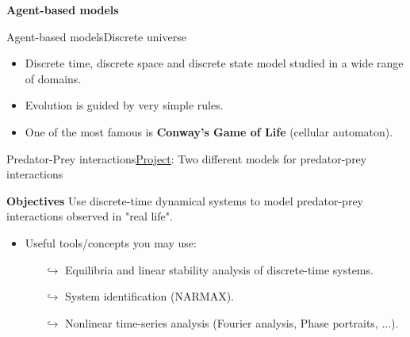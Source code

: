 \documentclass[usenames,dvipsnames,svgnames,10pt,aspectratio=169]{beamer}
\begin{document}
\begin{frame}[t, c]{}
	\centering
	\vspace{1cm}

	{\Large \textbf{Agent-based models}}

	\bigskip

	{}

\end{frame}

\begin{frame}[t, c]{Agent-based models}{Discrete universe}
	\begin{minipage}{.48\textwidth}
		\begin{itemize}
			\item Discrete time, discrete space and discrete state model studied in a wide range of domains.

			\bigskip

			\item Evolution is guided by very simple rules.

			\bigskip

			\item One of the most famous is \alert{\textbf{Conway's Game of Life}} (cellular automaton).
		\end{itemize}
	\end{minipage}%
	\hfill
	\begin{minipage}{.48\textwidth}

	\end{minipage}

	\vspace{1cm}
\end{frame}

\begin{frame}[t, c]{Predator-Prey interactions}{\underline{Project}: Two different models for predator-prey interactions}

		\begin{block}{\centering \textbf{Objectives}}
			\centering
			Use discrete-time dynamical systems to model predator-prey interactions observed in "real life".
		\end{block}

		\bigskip

		\begin{itemize}
			\item Useful tools/concepts you may use:
			\begin{itemize}
				\item[$\hookrightarrow$] Equilibria and linear stability analysis of discrete-time systems.
				\item[$\hookrightarrow$] System identification (NARMAX).
				\item[$\hookrightarrow$] Nonlinear time-series analysis (Fourier analysis, Phase portraits, ...).
			\end{itemize}
		\end{itemize}

		\vspace{1cm}
\end{frame}
\end{document}
